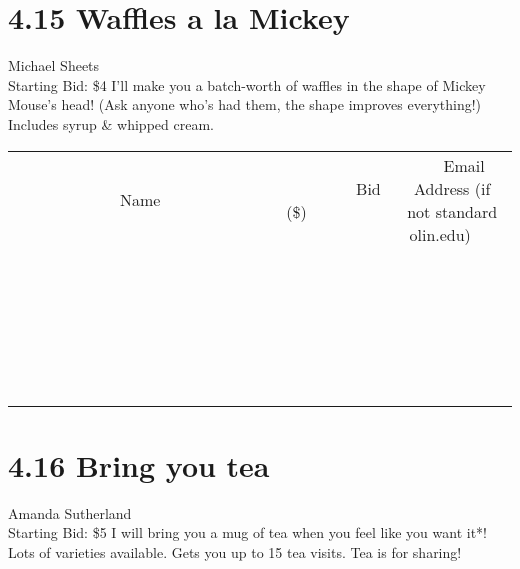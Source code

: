 \documentclass[11pt]{article}
\begin{document}
\section*{4.15 Waffles a la Mickey}
Michael Sheets
\\
Starting Bid: \$4
\newline
I'll make you a batch-worth of waffles in the shape of Mickey Mouse's head! (Ask anyone who's had them, the shape improves everything!)  Includes syrup \& whipped cream.
\\[6ex]
\begin{tabular}{c c c}
~~~~~~~~~~~~~Name~~~~~~~~~~~~~ & ~~~~~~~~~Bid (\$)~~~~~~~~~  & ~~~Email Address (if not standard olin.edu)~~~\\
 & & \\
\hline
 & & \\
\hline
 & & \\
\hline
 & & \\
\hline
 & & \\
\hline
 & & \\
\hline
 & & \\
\hline
 & & \\
\hline
 & & \\
\hline
 & & \\
\hline
 & & \\
\hline
 & & \\
\hline
 & & \\
\hline
 & & \\
\hline
 & & \\
\hline
 & & \\
\hline
 & & \\
\hline
 & & \\
\hline
 & & \\
\hline
 & & \\
\hline
 & & \\
\hline
 & & \\
\hline
 & & \\
\hline
 & & \\
\hline
 & & \\
\hline
 & & \\
\hline
\end{tabular}
\newpage
\section*{4.16 Bring you tea}
Amanda Sutherland
\\
Starting Bid: \$5
\newline
I will bring you a mug of tea when you feel like you want it*! Lots of varieties available. Gets you up to 15 tea visits. Tea is for sharing! 
\end{document}
